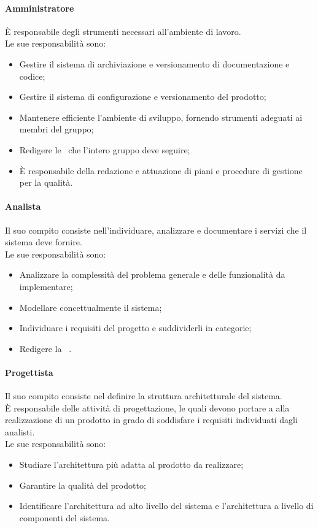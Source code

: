       \paragraph{Amministratore}
        È responsabile degli strumenti necessari all'ambiente di lavoro.\\
        Le sue responsabilità sono:
        \begin{itemize}
          \item Gestire il sistema di archiviazione e versionamento di documentazione e codice;
          \item Gestire il sistema di configurazione e versionamento del prodotto;
          \item Mantenere efficiente l'ambiente di sviluppo, fornendo strumenti adeguati ai membri del gruppo;
          \item Redigere le \docNameVersionNdP\ che l'intero gruppo deve seguire;
          \item È responsabile della redazione e attuazione di piani e procedure di gestione per la qualità.
        \end{itemize}

      \paragraph{Analista}
        Il suo compito consiste nell'individuare, analizzare e documentare i servizi che il sistema deve fornire.\\
        Le sue responsabilità sono:
        \begin{itemize}
          \item Analizzare la complessità del problema generale e delle funzionalità da implementare;
          \item Modellare concettualmente il sistema;
          \item Individuare i requisiti del progetto e suddividerli in categorie;
          \item Redigere la \docNameVersionAdR\ .
        \end{itemize}
      
      \paragraph{Progettista}
        Il suo compito consiste nel definire la struttura architetturale del sistema.\\
        È responsabile delle attività di progettazione, le quali devono portare a alla realizzazione di un prodotto in grado di soddisfare i requisiti individuati dagli analisti.\\
        Le sue responsabilità sono:
        \begin{itemize}
          \item Studiare l'architettura più adatta al prodotto da realizzare;
          \item Garantire la qualità del prodotto;
          \item Identificare l'architettura ad alto livello del sistema e l'architettura a livello di componenti del sistema.
        \end{itemize}

